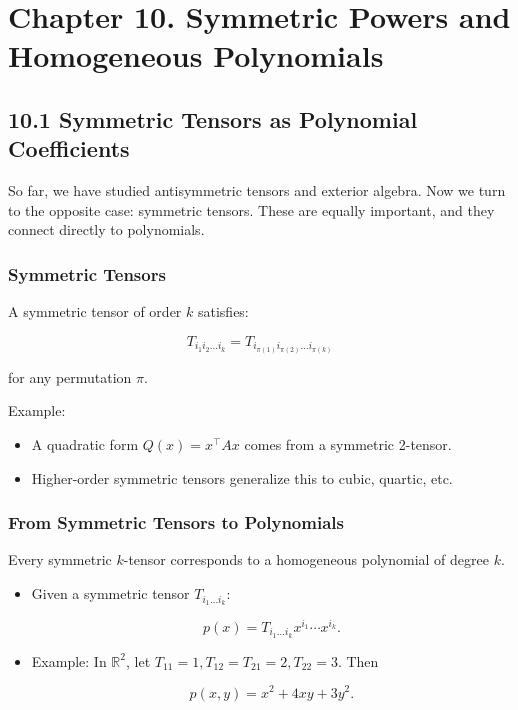 \documentclass[
  letterpaper,
  DIV=11,
  numbers=noendperiod]{scrreprt}
\providecommand{\tightlist}{%
  \setlength{\itemsep}{0pt}\setlength{\parskip}{0pt}}
\begin{document}
\section{Chapter 10. Symmetric Powers and Homogeneous
Polynomials}\label{chapter-10.-symmetric-powers-and-homogeneous-polynomials}

\subsection{10.1 Symmetric Tensors as Polynomial
Coefficients}\label{symmetric-tensors-as-polynomial-coefficients}

So far, we have studied antisymmetric tensors and exterior algebra. Now
we turn to the opposite case: symmetric tensors. These are equally
important, and they connect directly to polynomials.

\subsubsection{Symmetric Tensors}\label{symmetric-tensors-1}

A symmetric tensor of order \(k\) satisfies:

\[
T_{i_1 i_2 \dots i_k} = T_{i_{\pi(1)} i_{\pi(2)} \dots i_{\pi(k)}}
\]

for any permutation \(\pi\).

Example:

\begin{itemize}
\tightlist
\item
  A quadratic form \(Q(x) = x^\top A x\) comes from a symmetric
  2-tensor.
\item
  Higher-order symmetric tensors generalize this to cubic, quartic, etc.
\end{itemize}

\subsubsection{From Symmetric Tensors to
Polynomials}\label{from-symmetric-tensors-to-polynomials}

Every symmetric \(k\)-tensor corresponds to a homogeneous polynomial of
degree \(k\).

\begin{itemize}
\item
  Given a symmetric tensor \(T_{i_1 \dots i_k}\):

  \[
  p(x) = T_{i_1 \dots i_k} x^{i_1} \cdots x^{i_k}.
  \]
\item
  Example: In \(\mathbb{R}^2\), let
  \(T_{11}=1, T_{12}=T_{21}=2, T_{22}=3\). Then

  \[
  p(x,y) = x^2 + 4xy + 3y^2.
  \]
\end{itemize}
\end{document}
